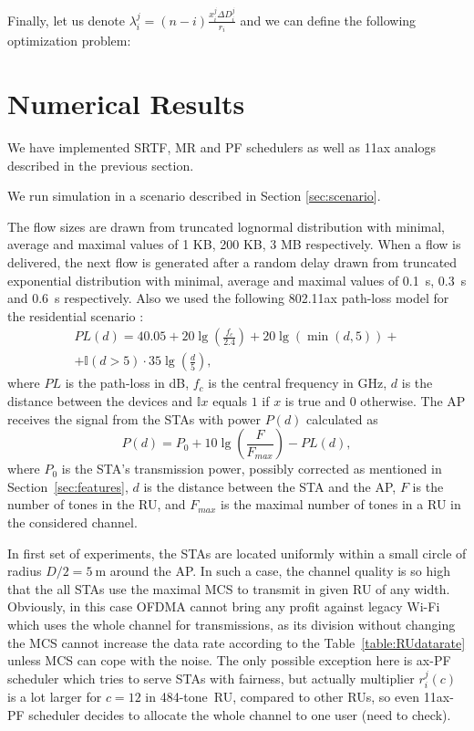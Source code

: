 Finally, let us denote $\lambda_i^j = \left(n - i\right) \frac{x_i^j \Delta D_i^j}{r_{i}}$ and we can define the following optimization problem:

\section{Numerical Results}
\label{sec:numerical}


We have implemented SRTF, MR and PF schedulers as well as 11ax analogs described in the previous section.

We run simulation in a scenario described in Section \ref{sec:scenario}.

The flow sizes are drawn from truncated lognormal distribution with minimal, average and maximal values of 1 KB, 200 KB, 3 MB respectively. 
When a flow is delivered, the next flow is generated after a random delay drawn from truncated exponential distribution with minimal, average and maximal values of \SI{0.1}{\s}, \SI{0.3}{\s} and \SI{0.6}{\s} respectively.
Also we used the following 802.11ax path-loss model for the residential scenario \cite{presentation_scenarios}:
\begin{multline*}
PL(d) = 40.05 + 20 \lg\left(\frac{f_c}{2.4}\right) + 20 \lg(\min(d, 5)) + \\
+ \mathbb{I}(d > 5) \cdot 35 \lg\left(\frac{d}{5}\right),
\end{multline*}
where $PL$ is the path-loss in dB, $f_c$ is the central frequency in GHz, $d$ is the distance between the devices and $\mathbb{I}{x}$ equals $1$ if $x$ is true and $0$ otherwise.
The AP receives the signal from the STAs with power $P(d)$ calculated as
$$
P(d) = P_0 + 10 \lg\left(\frac{F}{F_{max}}\right) - PL(d),
$$
where $P_0$ is the STA's transmission power, possibly corrected as mentioned in Section~\ref{sec:features}, $d$ is the distance between the STA and the AP, $F$ is the number of tones in the RU, and $F_{max}$ is the maximal number of tones in a RU in the considered channel.

In first set of experiments, the STAs are located uniformly within a small circle of radius $D/2 = \SI{5}{\m}$ around the AP.
In such a case, the channel quality is so high that the all STAs use the maximal MCS to transmit in given RU of any width.
Obviously, in this case OFDMA cannot bring any profit against legacy Wi-Fi which uses the whole channel for transmissions, as its division without changing the MCS cannot increase the data rate according to the Table~\ref{table:RUdatarate} unless MCS  can cope with the noise. The only possible exception here is ax-PF scheduler which tries to serve STAs with fairness, but actually multiplier $r^j_i (c)$ is a lot larger for $c=12$ in 484-tone~RU, compared to other RUs, so even 11ax-PF scheduler decides to allocate the whole channel to one user (need to check).


